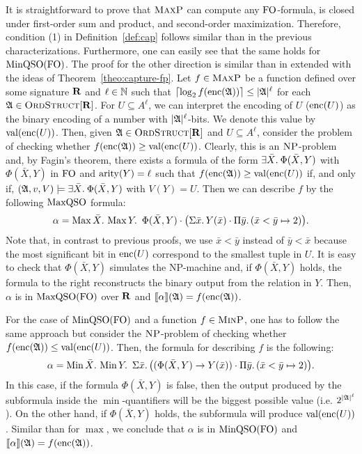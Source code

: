 It is straightforward to prove that $\text{\sc MaxP}$ can compute any ${\rm FO}$-formula, is closed under first-order sum and product, and second-order maximization. 
Therefore, condition (1) in Definition~\ref{def:cap} follows similar than in the previous characterizations. Furthermore, one can easily see that the same holds for ${\rm MinQSO}({\rm FO})$.
The proof for the other direction is similar than in \cite{kolaitis1994logical} extended with the ideas of Theorem~\ref{theo:capture-fp}. Let $f\in \text{\sc MaxP}$ be a function defined over some signature $\mathbf{R}$ and
$\ell\in\mathbb{N}$ such that $\lceil\log_2 f({\rm enc}(\mathfrak{A})) \rceil \leq |\mathfrak{A}|^\ell$ for each $\mathfrak{A}\in\text{\sc OrdStruct}[\mathbf{R}]$.
For $U \subseteq A^{\ell}$, we can interpret the encoding of $U$ (${\rm enc}(U)$) as the binary encoding of a number with $|\mathfrak{A}|^\ell$-bits. We denote this value by $\text{\rm val}({\rm enc}(U))$.
Then, given $\mathfrak{A}\in\text{\sc OrdStruct}[\mathbf{R}]$ and $U \subseteq A^{\ell}$, consider the problem of checking whether $f({\rm enc}(\mathfrak{A})) \geq \text{\rm val}({\rm enc}(U))$. 
Clearly, this is an $\text{\sc NP}$-problem and, by Fagin's theorem, there exists a formula of the form $\exists{\bar{X}}.\: \Phi(\bar{X}, Y)$ with $\Phi(\bar{X}, Y)$ in ${\rm FO}$ and ${\rm arity}(Y) = \ell$ such that $f({\rm enc}(\mathfrak{A})) \geq \text{\rm val}({\rm enc}(U))$ if, and only if, $(\mathfrak{A},v,V) \models \exists{\bar{X}}.\: \Phi(\bar{X}, Y)$ with $V(Y) = U$. 
Then we can describe $f$ by the following ${\rm MaxQSO}$ formula:
$$
\alpha = \maxa{\bar{X}} \maxa{Y} \ \Phi(\bar{X}, Y) \cdot \big( \sa{\bar{x}} Y(\bar{x}) \cdot \pa{\bar{y}}(\bar{x} < \bar{y} \mapsto 2) \big).
$$
Note that, in contrast to previous proofs, we use $\bar{x} < \bar{y}$ instead of $\bar{y} < \bar{x}$ because the most significant bit in ${\rm enc}(U)$ correspond to the smallest tuple in $U$.  
It is easy to check that $\Phi(\bar{X}, Y)$ simulates the NP-machine and, if $\Phi(\bar{X}, Y)$ holds, the formula to the right  reconstructs the binary output from the relation in $Y$.
Then, $\alpha$ is in ${\rm MaxQSO}({\rm FO})$ over $\mathbf{R}$ and ${\llbracket{}{\alpha}\rrbracket}(\mathfrak{A}) = f({\rm enc}(\mathfrak{A}))$. 

For the case of ${\rm MinQSO}({\rm FO})$ and a function $f \in \text{\sc MinP}$, one has to follow the same approach but consider the $\text{\sc NP}$-problem of checking whether $f({\rm enc}(\mathfrak{A})) \leq \text{\rm val}({\rm enc}(U))$. Then, the formula for describing $f$ is the following:
$$
\alpha = \operatorname{Min}{\bar{X}}.\, \operatorname{Min}{Y}.\, \ \Sigma{\bar{x}}.\, \big( (\Phi(\bar{X}, Y) \rightarrow Y(\bar{x})) \cdot \Pi{\bar{y}}.\,(\bar{x} < \bar{y} \mapsto 2)  \big).
$$
In this case, if the formula $\Phi(\bar{X}, Y)$ is false, then the output produced by the subformula inside the $\min$-quantifiers will be the biggest possible value (i.e. $2^{{|\mathfrak{A}|}^\ell}$).
On the other hand, if $\Phi(\bar{X}, Y)$ holds, the subformula will produce $\text{\rm val}({\rm enc}(U))$. 
Similar than for $\max$, we conclude that $\alpha$ is in ${\rm MinQSO}({\rm FO})$ and ${\llbracket{}{\alpha}\rrbracket}(\mathfrak{A}) = f({\rm enc}(\mathfrak{A}))$.
